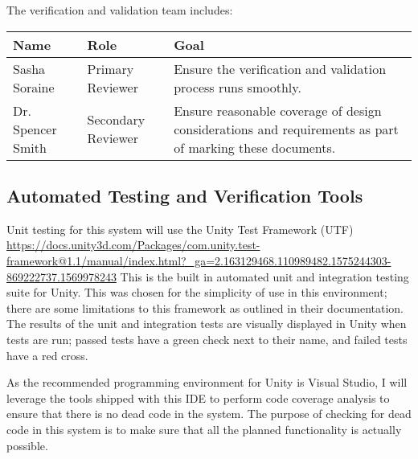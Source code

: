 \documentclass[12pt, titlepage]{article}
\begin{document}
The verification and validation team includes:

\begin{table}[h]
	\begin{tabular}{|l|l|p{8cm}|}
		\hline
		\textbf{Name} & \textbf{Role} & \textbf{Goal} \\
		\hline
		Sasha Soraine & Primary Reviewer& Ensure the verification and 
		validation process runs smoothly.\\
		Dr. Spencer Smith & Secondary Reviewer& Ensure reasonable coverage of 
		design considerations and requirements as part of marking these 
		documents. \\
		\hline
	\end{tabular}
\end{table}

\subsection{Automated Testing and Verification Tools}\label{testingTools}
Unit testing for this system will use the Unity Test Framework (UTF) 
\url{https://docs.unity3d.com/Packages/com.unity.test-framework@1.1/manual/index.html?_ga=2.163129468.110989482.1575244303-869222737.1569978243}
This is the built in automated unit and integration testing suite for Unity. 
This was chosen for the simplicity of use in this environment; there are some 
limitations to this framework as outlined in their documentation. The results 
of the unit and integration tests are visually displayed in Unity when tests 
are run; passed tests have a green check next to their name, and failed tests 
have a red cross.

As the recommended programming environment for Unity is Visual Studio, I will 
leverage the tools shipped with this IDE to perform code coverage analysis to 
ensure that there is no dead code in the system. The purpose of checking for 
dead code in this system is to make sure that all the planned functionality is 
actually possible.

\end{document}
